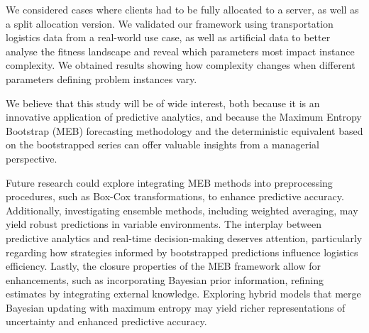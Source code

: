 \documentclass[opre,sglanonrev,11pt]{informs4}
\begin{document}
We considered cases where clients had to be fully allocated to a server, as well as a split allocation version. We validated our framework using transportation logistics data from a real-world use case, as well as artificial data to better analyse the fitness landscape and reveal which parameters most impact instance complexity. We obtained results showing how complexity changes when different parameters defining problem instances vary.

We believe that this study will be of wide interest, both because it is an innovative application of predictive analytics, and because the Maximum Entropy Bootstrap (MEB) forecasting methodology and the deterministic equivalent based on the bootstrapped series can offer valuable insights from a managerial perspective.

Future research could explore integrating MEB methods into preprocessing procedures, such as Box-Cox transformations, to enhance predictive accuracy. Additionally, investigating ensemble methods, including weighted averaging, may yield robust predictions in variable environments. The interplay between predictive analytics and real-time decision-making deserves attention, particularly regarding how strategies informed by bootstrapped predictions influence logistics efficiency. Lastly, the closure properties of the MEB framework allow for enhancements, such as incorporating Bayesian prior information, refining estimates by integrating external knowledge. Exploring hybrid models that merge Bayesian updating with maximum entropy may yield richer representations of uncertainty and enhanced predictive accuracy.

\clearpage %
\end{document}
